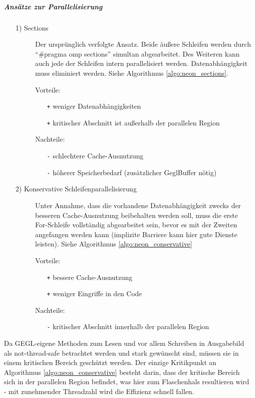 \subparagraph{Ansätze zur Parallelisierung}
\begin{enumerate}
	\item [] \begin{description} %
		\item[1) Sections] Der ursprünglich verfolgte Ansatz. Beide äußere Schleifen werden durch ``\#pragma omp sections'' simultan abgearbeitet. Des Weiteren kann auch jede der Schleifen intern parallelisiert werden. Datenabhängigkeit muss eliminiert werden. Siehe Algorithmus \ref{algo:neon_sections}.
		
		Vorteile:
		\begin{itemize}
		\item[\texttt{+}] weniger Datenabhängigkeiten
		\item[\texttt{+}] kritischer Abschnitt ist außerhalb der parallelen Region
		\end{itemize}
		
		Nachteile:
		\begin{itemize}
		\item[\texttt{-}] schlechtere Cache-Ausnutzung
		\item[\texttt{-}] höherer Speicherbedarf (zusätzlicher GeglBuffer nötig)
		\end{itemize}
		

		\item[2) Konservative Schleifenparallelisierung] Unter Annahme, dass die vorhandene Datenabhängigkeit zwecks der besseren Cache-Ausnutzung beibehalten werden soll, muss die erste For-Schleife vollständig abgearbeitet sein, bevor es mit der Zweiten angefangen werden kann (implizite Barriere kann hier gute Dienste leisten). Siehe Algorithmus \ref{algo:neon_conservative}

		Vorteile:
		\begin{itemize}
		\item[\texttt{+}] bessere Cache-Ausnutzung
		\item[\texttt{+}] weniger Eingriffe in den Code
		\end{itemize}
		
		Nachteile:
		\begin{itemize}
		\item[\texttt{-}] kritischer Abschnitt innerhalb der parallelen Region 
		\end{itemize}
	\end{description}
\end{enumerate}

Da GEGL-eigene Methoden zum Lesen und vor allem Schreiben in Ausgabebild als not-thread-safe betrachtet werden und stark gewünscht sind, müssen sie in einem kritischen Bereich geschützt werden.
Der einzige Kritikpunkt an Algorithmus \ref{algo:neon_conservative} besteht darin, dass der kritische Bereich sich in der parallelen Region befindet, was hier zum Flaschenhals resultieren wird - mit zunehmender Threadzahl wird die Effizienz schnell fallen.

